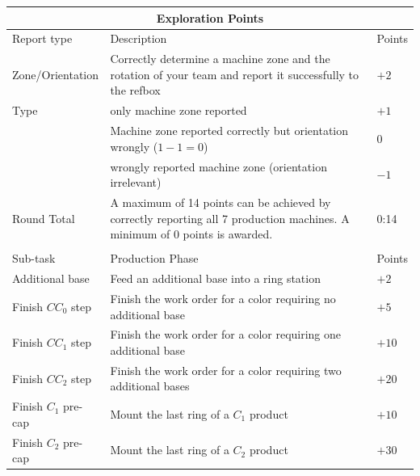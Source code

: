 \documentclass[12pt,twoside]{article}
\newcommand{\SItextrange}[3][]{
  \SI[
  input-quotient=:,
  output-quotient=\text{ to },
  quotient-mode=symbol,
  #1
  ]
  {#2}{#3}
}
\begin{document}
\begin{longtable}{p{}
    |p{}
    |p{}}

          \multicolumn{3}{c}{\textbf{Exploration Points}}\\\hline
           \multicolumn{1}{l}{Report type}
           & \multicolumn{1}{l}{Description}
           & \multicolumn{1}{l}{Points}\\\hline\hline
          Zone/Orientation
          & Correctly determine a machine zone and the rotation of your team
            and report it successfully to the refbox
          & $+2$
          \\
          Type
          & only machine zone reported
          & $+1$
          \\
          & Machine zone reported correctly but orientation wrongly ($1-1=0$)
          & $0$
          \\
		      & wrongly reported machine zone (orientation irrelevant)
          & $-1$
          \\
          \hline
          Round Total
          & A maximum of 14 points can be achieved by correctly reporting all
            7 production machines. A minimum of 0 points is awarded.
          & \SItextrange{0:14}{}\\
          \hhline{===}
          \multicolumn{3}{c}{\textbf{Production Points}}\\\hline
        \multicolumn{1}{l}{Sub-task }
        & \multicolumn{1}{l}{Production Phase}
        & \multicolumn{1}{l}{Points}
        \\
        \hline\hline
        Additional base & Feed an additional base into a ring station & $+2$
        \\
        Finish $CC_0$ step
        & Finish the work order for a color requiring no additional base
        & $+5$
        \\
        Finish $CC_1$ step
        & Finish the work order for a color requiring one additional base
        & $+10$
        \\
        Finish $CC_2$ step
        & Finish the work order for a color requiring two additional bases
        & $+20$
        \\
        Finish $C_1$ pre-cap & Mount the last ring of a $C_1$ product & $+10$
        \\
        Finish $C_2$ pre-cap & Mount the last ring of a $C_2$ product & $+30$
        \\

\end{longtable}
\end{document}
